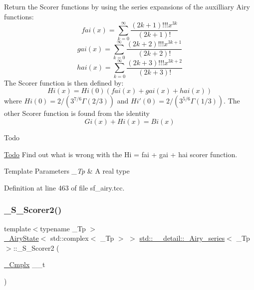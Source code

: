 Return the Scorer functions by using the series expansions of the auxilliary Airy functions\+: \[ fai(x) = \sum_{k=0}^\infty \frac{(2k+1)!!!x^{3k}}{(2k+1)!} \] \[ gai(x) = \sum_{k=0}^\infty \frac{(2k+2)!!!x^{3k+1}}{(2k+2)!} \] \[ hai(x) = \sum_{k=0}^\infty \frac{(2k+3)!!!x^{3k+2}}{(2k+3)!} \] The Scorer function is then defined by\+: \[ Hi(x) = Hi(0)\left(fai(x) + gai(x) + hai(x)\right) \] where $ Hi(0) = 2/(3^{7/6}\Gamma(2/3)) $ and $ Hi'(0) = 2/(3^{5/6}\Gamma(1/3)) $. The other Scorer function is found from the identity \[ Gi(x) + Hi(x) = Bi(x) \]

\begin{DoxyRefDesc}{Todo}
\item[\hyperlink{todo__todo000006}{Todo}]Find out what is wrong with the Hi = fai + gai + hai scorer function.\end{DoxyRefDesc}



\begin{DoxyTemplParams}{Template Parameters}
{\em \+\_\+\+Tp} & A real type \\
\hline
\end{DoxyTemplParams}


Definition at line 463 of file sf\+\_\+airy.\+tcc.

\mbox{\label{classstd_1_1____detail_1_1__Airy__series_a0fb092c153034223a390e259d2f32836}} 
\subsubsection{\texorpdfstring{\+\_\+\+S\+\_\+\+Scorer2()}{\_S\_Scorer2()}}
{\footnotesize\ttfamily template$<$typename \+\_\+\+Tp $>$ \\
\hyperlink{structstd_1_1____detail_1_1__AiryState}{\+\_\+\+Airy\+State}$<$ std\+::complex$<$ \+\_\+\+Tp $>$ $>$ \hyperlink{classstd_1_1____detail_1_1__Airy__series}{std\+::\+\_\+\+\_\+detail\+::\+\_\+\+Airy\+\_\+series}$<$ \+\_\+\+Tp $>$\+::\+\_\+\+S\+\_\+\+Scorer2 (\begin{DoxyParamCaption}\item[{\hyperlink{classstd_1_1____detail_1_1__Airy__series_ab41161caa54609f4735987fbaed41d9d}{\+\_\+\+Cmplx}}]{\+\_\+\+\_\+t }\end{DoxyParamCaption})\hspace{0.3cm}{\ttfamily [static]}}


